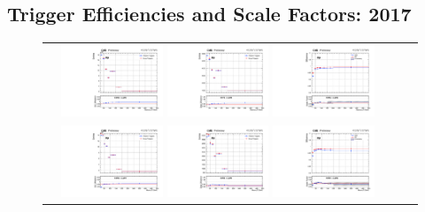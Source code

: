 \clearpage
\subsection{Trigger Efficiencies and Scale Factors: 2017}
\label{TrigSFResults2017}

\begin{figure}[!htb]
  \begin{center}
    \begin{tabular}{ccc}
      \includegraphics[width=0.30\textwidth]{fig_2017_TrigSF/g_lepApt_emu_MC.pdf}
      \includegraphics[width=0.30\textwidth]{fig_2017_TrigSF/g_lepApt_emu_data.pdf}
      \includegraphics[width=0.30\textwidth]{fig_2017_TrigSF/g_emu_lepApt_FullSystUncBand.pdf}\\
      \includegraphics[width=0.30\textwidth]{fig_2017_TrigSF/g_lepBpt_emu_MC.pdf}
      \includegraphics[width=0.30\textwidth]{fig_2017_TrigSF/g_lepBpt_emu_data.pdf}
      \includegraphics[width=0.30\textwidth]{fig_2017_TrigSF/g_emu_lepBpt_FullSystUncBand.pdf}\\

\end{tabular}
\end{center}
\end{figure}
